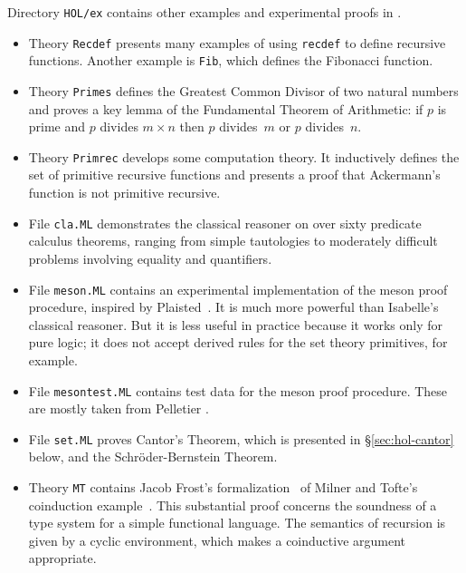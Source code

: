 Directory \texttt{HOL/ex} contains other examples and experimental proofs in
{\HOL}.  
\begin{itemize}
\item Theory \texttt{Recdef} presents many examples of using \texttt{recdef}
  to define recursive functions.  Another example is \texttt{Fib}, which
  defines the Fibonacci function.

\item Theory \texttt{Primes} defines the Greatest Common Divisor of two
  natural numbers and proves a key lemma of the Fundamental Theorem of
  Arithmetic: if $p$ is prime and $p$ divides $m\times n$ then $p$ divides~$m$
  or $p$ divides~$n$.

\item Theory \texttt{Primrec} develops some computation theory.  It
  inductively defines the set of primitive recursive functions and presents a
  proof that Ackermann's function is not primitive recursive.

\item File \texttt{cla.ML} demonstrates the classical reasoner on over sixty
  predicate calculus theorems, ranging from simple tautologies to
  moderately difficult problems involving equality and quantifiers.

\item File \texttt{meson.ML} contains an experimental implementation of the {\sc
    meson} proof procedure, inspired by Plaisted~\cite{plaisted90}.  It is
  much more powerful than Isabelle's classical reasoner.  But it is less
  useful in practice because it works only for pure logic; it does not
  accept derived rules for the set theory primitives, for example.

\item File \texttt{mesontest.ML} contains test data for the {\sc meson} proof
  procedure.  These are mostly taken from Pelletier \cite{pelletier86}.

\item File \texttt{set.ML} proves Cantor's Theorem, which is presented in
  {\S}\ref{sec:hol-cantor} below, and the Schr{\"o}der-Bernstein Theorem.

\item Theory \texttt{MT} contains Jacob Frost's formalization~\cite{frost93} of
  Milner and Tofte's coinduction example~\cite{milner-coind}.  This
  substantial proof concerns the soundness of a type system for a simple
  functional language.  The semantics of recursion is given by a cyclic
  environment, which makes a coinductive argument appropriate.
\end{itemize}


